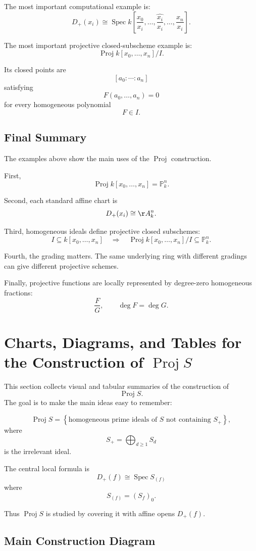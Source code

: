 \documentclass[12pt,a4paper]{article}
\DeclareMathOperator{\Spec}{Spec}
\DeclareMathOperator{\Proj}{Proj}
\newcommand{\PP}{\mathbb P}
\theoremstyle{notespace}
\begin{document}
The most important computational example is:
\[
\boxed{
	D_+(x_i)
	\cong
	\Spec k\left[
	\frac{x_0}{x_i},
	\dots,
	\widehat{\frac{x_i}{x_i}},
	\dots,
	\frac{x_n}{x_i}
	\right].
}
\]

The most important projective closed-subscheme example is:
\[
\boxed{
	\Proj k[x_0,\dots,x_n]/I.
}
\]

Its closed points are
\[
[a_0:\cdots:a_n]
\]
satisfying
\[
F(a_0,\dots,a_n)=0
\]
for every homogeneous polynomial
\[
F\in I.
\]

\subsection{Final Summary}

The examples above show the main uses of the \(\Proj\) construction.

First,
\[
\Proj k[x_0,\dots,x_n]
=
\PP_k^n.
\]

Second, each standard affine chart is
\[
D_+(x_i)
\cong
\AA_k^n.
\]

Third, homogeneous ideals define projective closed subschemes:
\[
I\subseteq k[x_0,\dots,x_n]
\quad\Longrightarrow\quad
\Proj k[x_0,\dots,x_n]/I
\subseteq
\PP_k^n.
\]

Fourth, the grading matters. The same underlying ring with different gradings can give different projective schemes.

Finally, projective functions are locally represented by degree-zero homogeneous fractions:
\[
\frac{F}{G},
\qquad
\deg F=\deg G.
\]


\section{Charts, Diagrams, and Tables for the Construction of \texorpdfstring{$\Proj S$}{Proj S}}

This section collects visual and tabular summaries of the construction of
\[
\Proj S.
\]
The goal is to make the main ideas easy to remember:

\[
\Proj S
=
\left\{
\text{homogeneous prime ideals of }S
\text{ not containing }S_+
\right\},
\]
where
\[
S_+=\bigoplus_{d\ge 1}S_d
\]
is the irrelevant ideal.

The central local formula is
\[
\boxed{
	D_+(f)\cong \Spec S_{(f)}
}
\]
where
\[
S_{(f)}=(S_f)_0.
\]

Thus \(\Proj S\) is studied by covering it with affine opens \(D_+(f)\).

\subsection{Main Construction Diagram}
\end{document}
